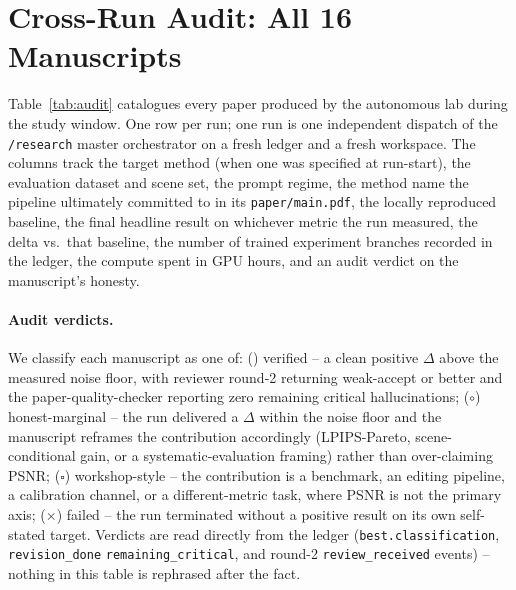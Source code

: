 
\section{Cross-Run Audit: All 16 Manuscripts}
\label{sec:audit}

Table~\ref{tab:audit} catalogues every paper produced by the autonomous
lab during the study window.  One row per run; one run is one
independent dispatch of the \texttt{/research} master orchestrator on a
fresh ledger and a fresh workspace.  The columns track the target
method (when one was specified at run-start), the evaluation dataset
and scene set, the prompt regime, the method name the pipeline
ultimately committed to in its \texttt{paper/main.pdf}, the locally
reproduced baseline, the final headline result on whichever metric the
run measured, the delta vs.\ that baseline, the number of trained
experiment branches recorded in the ledger, the compute spent in GPU
hours, and an audit verdict on the manuscript's honesty.

\paragraph{Audit verdicts.}  We classify each manuscript as one of:
(\textbf{\checkmark}) verified -- a clean positive $\Delta$ above the
measured noise floor, with reviewer round-2 returning weak-accept or
better and the paper-quality-checker reporting zero remaining critical
hallucinations;
($\circ$) honest-marginal -- the run delivered a $\Delta$ within the
noise floor and the manuscript reframes the contribution accordingly
(LPIPS-Pareto, scene-conditional gain, or a systematic-evaluation
framing) rather than over-claiming PSNR;
($\square$) workshop-style -- the contribution is a benchmark, an
editing pipeline, a calibration channel, or a different-metric task,
where PSNR is not the primary axis;
($\times$) failed -- the run terminated without a positive result on
its own self-stated target.  Verdicts are read directly from the
ledger (\texttt{best.classification}, \texttt{revision\_done}
\texttt{remaining\_critical}, and round-2 \texttt{review\_received}
events) -- nothing in this table is rephrased after the fact.

